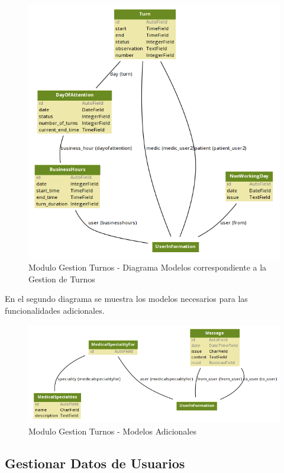 \begin{figure}[H]
    \centering
    \includegraphics[scale=0.6]{resourse/gt-gt.png}
    \caption{Modulo Gestion Turnos - Diagrama Modelos correspondiente a la Gestion de Turnos}
    \label{fig:124}
\end{figure}  

En el segundo diagrama se muestra los modelos necesarios para las funcionalidades 
adicionales.

\begin{figure}[H]
    \centering
    \includegraphics[scale=0.6]{resourse/gt-ot.png}
    \caption{Modulo Gestion Turnos - Modelos Adicionales}
    \label{fig:125}
\end{figure}  


\subsection{Gestionar Datos de Usuarios}

